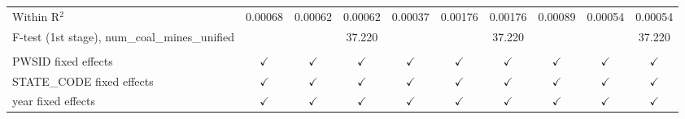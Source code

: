 \begin{table}[htbp]
\begin{adjustbox}{width = \textwidth, center}
\begin{tabular}{lccccccccc}
         Within R$^2$                                     & 0.00068       & 0.00062       & 0.00062       & 0.00037       & 0.00176         & 0.00176       & 0.00089       & 0.00054       & 0.00054\\  
         F-test (1st stage), num\_coal\_mines\_unified    &               &               & 37.220        &               &                 & 37.220        &               &               & 37.220\\  
          \\
         PWSID fixed effects                              & $\checkmark$  & $\checkmark$  & $\checkmark$  & $\checkmark$  & $\checkmark$    & $\checkmark$  & $\checkmark$  & $\checkmark$  & $\checkmark$\\   
         STATE\_CODE fixed effects                        & $\checkmark$  & $\checkmark$  & $\checkmark$  & $\checkmark$  & $\checkmark$    & $\checkmark$  & $\checkmark$  & $\checkmark$  & $\checkmark$\\   
         year fixed effects                               & $\checkmark$  & $\checkmark$  & $\checkmark$  & $\checkmark$  & $\checkmark$    & $\checkmark$  & $\checkmark$  & $\checkmark$  & $\checkmark$\\   
         \bottomrule
      \end{tabular}
   \end{adjustbox}
\end{table}


